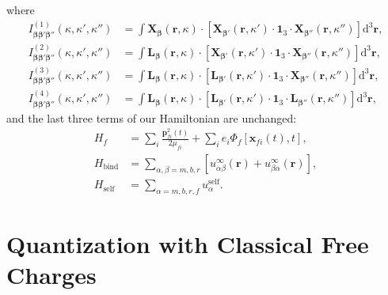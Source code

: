 \documentclass{article}
\begin{document}
where
\begin{equation}
\begin{split}
I_{\bm{\beta}\bm{\beta}'\bm{\beta}''}^{(1)}(\kappa,\kappa',\kappa'') &= \int\mathbf{X}_{\bm{\beta}}(\mathbf{r},\kappa)\cdot\left[\mathbf{X}_{\bm{\beta}'}(\mathbf{r},\kappa')\cdot\bm{1}_3\cdot\mathbf{X}_{\bm{\beta}''}(\mathbf{r},\kappa'')\right]\mathrm{d}^3\mathbf{r},\\
I_{\bm{\beta}\bm{\beta}'\bm{\beta}''}^{(2)}(\kappa,\kappa',\kappa'') &= \int\mathbf{L}_{\bm{\beta}}(\mathbf{r},\kappa)\cdot\left[\mathbf{X}_{\bm{\beta}'}(\mathbf{r},\kappa')\cdot\bm{1}_3\cdot\mathbf{X}_{\bm{\beta}''}(\mathbf{r},\kappa'')\right]\mathrm{d}^3\mathbf{r},\\
I_{\bm{\beta}\bm{\beta}'\bm{\beta}''}^{(3)}(\kappa,\kappa',\kappa'') &= \int\mathbf{L}_{\bm{\beta}}(\mathbf{r},\kappa)\cdot\left[\mathbf{L}_{\bm{\beta}'}(\mathbf{r},\kappa')\cdot\bm{1}_3\cdot\mathbf{X}_{\bm{\beta}''}(\mathbf{r},\kappa'')\right]\mathrm{d}^3\mathbf{r},\\
I_{\bm{\beta}\bm{\beta}'\bm{\beta}''}^{(4)}(\kappa,\kappa',\kappa'') &= \int\mathbf{L}_{\bm{\beta}}(\mathbf{r},\kappa)\cdot\left[\mathbf{L}_{\bm{\beta}'}(\mathbf{r},\kappa')\cdot\bm{1}_3\cdot\mathbf{L}_{\bm{\beta}''}(\mathbf{r},\kappa'')\right]\mathrm{d}^3\mathbf{r},
\end{split}
\end{equation}
and the last three terms of our Hamiltonian are unchanged:
\begin{equation}
\begin{split}
H_f &= \sum_i\frac{\mathbf{p}_{fi}^2(t)}{2\mu_{fi}} + \sum_ie_i\Phi_f[\mathbf{x}_{fi}(t),t],\\
H_\mathrm{bind} &= \sum_{\alpha,\beta = m,b,r}\left[u_{\alpha\beta}^\infty(\mathbf{r}) + u_{\beta\alpha}^\infty(\mathbf{r})\right],\\
H_\mathrm{self} &= \sum_{\alpha = m,b,r,f}u_\alpha^\mathrm{self}.
\end{split}
\end{equation}






















\newpage
\section{Quantization with Classical Free Charges}\label{sec:quantization}
\end{document}
